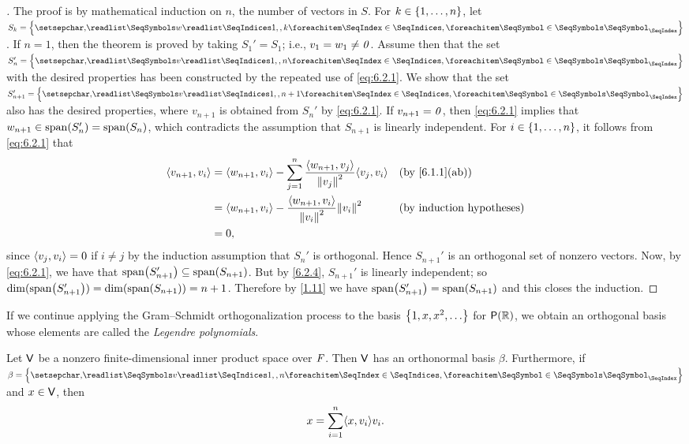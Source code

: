 \begin{proof}[]
	The proof is by mathematical induction on \(n\), the number of vectors in \(S\).
	For \(k \in \left\lbrace1, \dots, n\right\rbrace\), let \(S_k = \set{\seq{w}{1,,k}}\).
	If \(n = 1\), then the theorem is proved by taking \(S_1' = S_1\);
	i.e., \(v_1 = w_1 \neq \mathit{0}\).
	Assume then that the set \(S_n' = \set{\seq{v}{1,,n}}\) with the desired properties has been constructed by the repeated use of \cref{eq:6.2.1}.
	We show that the set \(S_{n + 1}' = \set{\seq{v}{1,,n+1}}\) also has the desired properties, where \(v_{n + 1}\) is obtained from \(S_n'\) by \cref{eq:6.2.1}.
	If \(v_{n + 1} = \mathit{0}\), then \cref{eq:6.2.1} implies that \(w_{n + 1} \in \spn{S_n'} = \spn{S_n}\), which contradicts the assumption that \(S_{n + 1}\) is linearly independent.
	For \(i \in \left\lbrace1, \dots, n\right\rbrace\), it follows from \cref{eq:6.2.1} that
	\begin{align*}
		\inn{v_{n + 1}, v_i} & = \inn{w_{n + 1}, v_i} - \sum_{j = 1}^n \frac{\inn{w_{n + 1}, v_j}}{\norm{v_j}^2} \inn{v_j, v_i} &  & \by{6.1.1}[ab]                   \\
		                     & = \inn{w_{n + 1}, v_i} - \frac{\inn{w_{n + 1}, v_i}}{\norm{v_i}^2} \norm{v_i}^2                  &  & \text{(by induction hypotheses)} \\
		                     & = 0,
	\end{align*}
	since \(\left\langle v_j, v_i\right\rangle = 0\) if \(i \neq j\) by the induction assumption that \(S_n'\) is orthogonal.
	Hence \(S_{n + 1}'\) is an orthogonal set of nonzero vectors.
	Now, by \cref{eq:6.2.1}, we have that \(\spn{S_{n + 1}'} \subseteq \spn{S_{n + 1}}\).
	But by \cref{6.2.4}, \(S_{n + 1}'\) is linearly independent;
	so \(\dim(\spn{S_{n + 1}'}) = \dim(\spn{S_{n + 1}}) = n + 1\).
	Therefore by \cref{1.11} we have \(\spn{S_{n + 1}'} = \spn{S_{n + 1}}\) and this closes the induction.
\end{proof}

\begin{defn}\label{6.2.5}
	If we continue applying the Gram--Schmidt orthogonalization process to the basis \(\set{1, x, x^2, \dots}\) for \(\ps{\R}\), we obtain an orthogonal basis whose elements are called the \emph{Legendre polynomials}.
\end{defn}

\begin{thm}\label{6.5}
	Let \(\mathsf{V}\) be a nonzero finite-dimensional inner product space over \(\mathit{F}\).
	Then \(\mathsf{V}\) has an orthonormal basis \(\beta\).
	Furthermore, if \(\beta = \set{\seq{v}{1,,n}}\) and \(x \in \mathsf{V}\), then
	\[
		x = \sum_{i = 1}^n \inn{x, v_i} v_i.
	\]
\end{thm}

